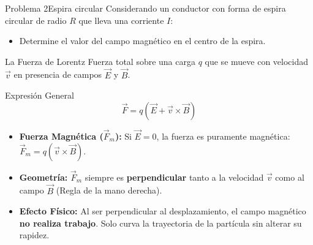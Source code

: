 \documentclass[10pt, aspectratio=169]{beamer}
\begin{document}
\begin{frame}{Problema 2}{Espira circular}
    Considerando un conductor con forma de espira circular de radio $R$ que lleva una corriente $I$:
    \begin{itemize}
        \item Determine el valor del campo magnético en el centro de la espira.
    \end{itemize}
    \begin{figure}
        \centering

    \end{figure}

\end{frame}

\begin{frame}{La Fuerza de Lorentz}
    Fuerza total sobre una carga $q$ que se mueve con velocidad $\vec{v}$ en presencia de campos $\vec{E}$ y $\vec{B}$.

    \begin{boxTeoria}{Expresión General}
        \begin{equation*}
            \vec{F} = q (\vec{E} + \vec{v} \times \vec{B})
        \end{equation*}
    \end{boxTeoria}

    \begin{itemize}
        \item \textbf{Fuerza Magnética ($\vec{F}_m$):} Si $\vec{E} = 0$, la fuerza es puramente magnética: $\vec{F}_m = q (\vec{v} \times \vec{B})$.
        \item \textbf{Geometría:} $\vec{F}_m$ siempre es \textbf{perpendicular} tanto a la velocidad $\vec{v}$ como al campo $\vec{B}$ (Regla de la mano derecha).
        \item \textbf{Efecto Físico:} Al ser perpendicular al desplazamiento, el campo magnético \textbf{no realiza trabajo}. Solo curva la trayectoria de la partícula sin alterar su rapidez.
    \end{itemize}
\end{frame}
\end{document}
